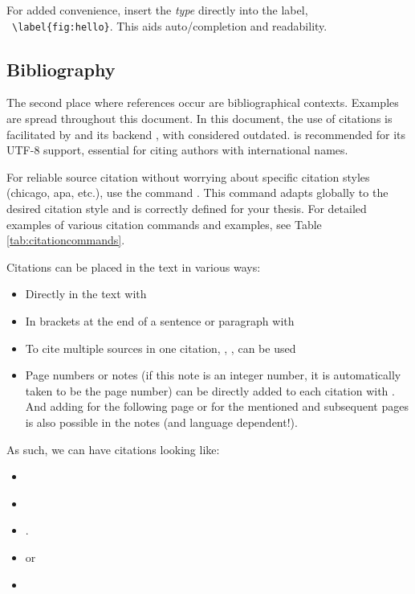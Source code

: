 For added convenience, insert the \emph{type} directly into the label,
\ \verb|\label{fig:hello}|.
This aids auto\-/completion and readability.

\subsection{Bibliography}
\label{ch:bibliography_rationale}

The second place where references occur are bibliographical contexts.
Examples are spread throughout this document.
In this document, the use of citations is facilitated by  and its backend , with  considered outdated.  is recommended for its UTF-8 support, essential for citing authors with international names.

For reliable source citation without worrying about specific citation styles (chicago, apa, etc.), use the command . This command adapts globally to the desired citation style and is correctly defined for your thesis. For detailed examples of various citation commands and examples, see Table \ref{tab:citationcommands}.

Citations can be placed in the text in various ways:
\begin{itemize}
    \item Directly in the text with 
    \item In brackets at the end of a sentence or paragraph with 
    \item To cite multiple sources in one citation, \fakeverb{\cites{}}, \fakeverb{\textcites{}}, \fakeverb{\parencites{}} can be used
    \item Page numbers or notes (if this note is an integer number, it is
          automatically taken to be the page number) can be directly added to each citation with \fakeverb{[]}. And adding \fakeverb{\psq} for the following page or \fakeverb{\psqq} for the mentioned and subsequent pages is also possible in the notes (and language dependent!).
\end{itemize}

\clearpage
As such, we can have citations looking like:
\begin{itemize}
    \item \cite{einstein1905}
    \item \cites{einstein1905, diracPrinciplesQuantumMechanics1981}
    \item \cites[8]{einstein1905}[29\psqq]{goossensLaTeXCompanion1993}[2-9]{knuthTeXbook1986}[89\psq]{knuthFundamentalAlgorithms1973}{diracPrinciplesQuantumMechanics1981}.
    \item \parencites{baehrThermodynamikGrundlagenUnd2016,birdNaturalLanguageProcessing2009} or \parencites(vgl.)()[15\psq]{baehrThermodynamikGrundlagenUnd2016}[132\psqq]{birdNaturalLanguageProcessing2009}
    \item \textcites[5]{baehrThermodynamikGrundlagenUnd2016}[50-56]{dubbelTaschenbuchFurMaschinenbau2007}
\end{itemize}

